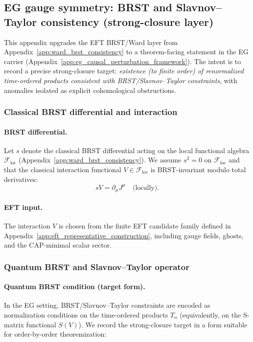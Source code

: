 \subsection{EG gauge symmetry: BRST and Slavnov--Taylor consistency (strong-closure layer)}
\label{app:eg_brst_st_consistency}

\AuditTag This appendix upgrades the EFT BRST/Ward layer from Appendix~\ref{app:ward_brst_consistency} to a theorem-facing statement in the EG carrier (Appendix~\ref{app:eg_causal_perturbation_framework}).
The intent is to record a precise strong-closure target: \emph{existence (to finite order) of renormalized time-ordered products consistent with BRST/Slavnov--Taylor constraints}, with anomalies isolated as explicit cohomological obstructions.

\subsubsection{Classical BRST differential and interaction}
\paragraph{BRST differential.}
Let $s$ denote the classical BRST differential acting on the local functional algebra $\mathcal{F}_{\mathrm{loc}}$ (Appendix~\ref{app:ward_brst_consistency}).
We assume $s^2=0$ on $\mathcal{F}_{\mathrm{loc}}$ and that the classical interaction functional $V\in\mathcal{F}_{\mathrm{loc}}$ is BRST-invariant modulo total derivatives:
\[
sV=\partial_\mu J^\mu
\quad\text{(locally).}
\]

\paragraph{EFT input.}
\InterfaceTag The interaction $V$ is chosen from the finite EFT candidate family defined in Appendix~\ref{app:eft_representative_construction}, including gauge fields, ghosts, and the CAP-minimal scalar sector.

\subsubsection{Quantum BRST and Slavnov--Taylor operator}
\paragraph{Quantum BRST condition (target form).}
In the EG setting, BRST/Slavnov--Taylor constraints are encoded as normalization conditions on the time-ordered products $T_n$ (equivalently, on the S-matrix functional $S(V)$).
We record the strong-closure target in a form suitable for order-by-order theoremization:

